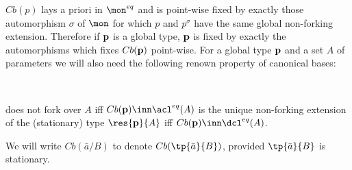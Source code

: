 $Cb(p)$ lays a priori in $\mon^{eq}$ and is point-wise fixed by exactly those automorphism $\sigma$ of $\mon$
for which $p$ and $p^{\sigma}$ have the same global non-forking extension.
Therefore if ${\bf p}$ is a global type, ${\bf p}$ is fixed by exactly the automorphisms which fixes $Cb({\bf p})$ point-wise.
For a global type ${\bf p}$ and a set $A$
of parameters we will also need the following renown property of canonical bases:
\begin{fact}\label{ziecb}{\ }
\begin{itemize}
 does not fork over $A$ iff $Cb({\bf p})\inn\acl^{eq}(A)$
 is the unique non-forking extension of the (stationary) type $\res{{\bf p}}{A}$ iff $Cb({\bf p})\inn\dcl^{eq}(A)$.
\end{itemize}
\end{fact}
We will write $Cb(\bar a/B)$ to denote $Cb(\tp{\bar a}{B})$, provided $\tp{\bar a}{B}$ is stationary.

